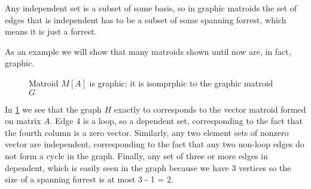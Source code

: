 Any independent set is a subset of some basis, so in graphic matroids the set of edges that is independent has to be a subset of some spanning forrest, which means it is just a forrest.

As an example we will show that many matroids shown until now are, in fact, graphic. 


 
\begin{figure}[H]
    \centering
    \qquad
    \caption{Matroid $M[A]$ is graphic; it is isomprphic to the graphic matroid $G$}%
    \label{graphic}%
\end{figure}

In \ref{graphic} we see that the graph $H$ exactly to corresponds to the vector matroid formed on matrix $A$. Edge 4 is a loop, so a dependent set, corresponding to the fact that the fourth column is a zero vector. Similarly, any two element sets of nonzero vector are independent, corresponding to the fact that any two non-loop edges do not form a cycle in the graph. Finally, any set of three or more edges in dependent, which is easily seen in the graph because we have 3 vertices so the size of a spanning forrest is at most 3 - 1 = 2.


